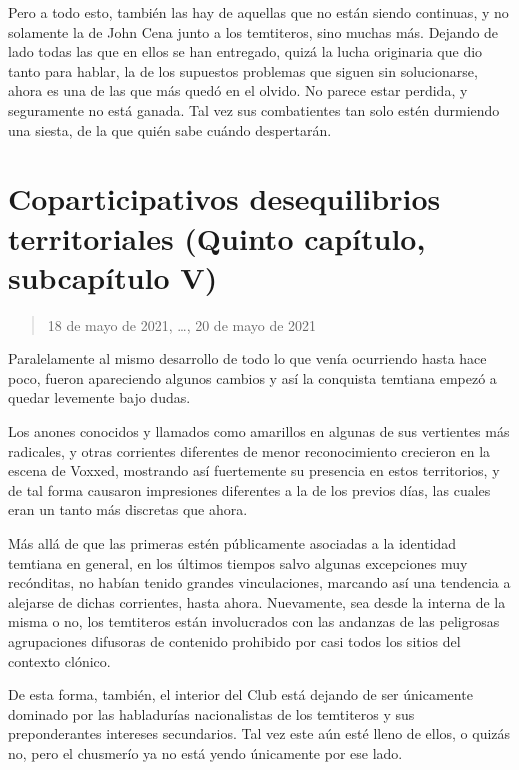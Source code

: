 \documentclass[
  spanish,
]{book}
\begin{document}
Pero a todo esto, también las hay de aquellas que no están siendo continuas, y no solamente la de John Cena junto a los temtiteros, sino muchas más. Dejando de lado todas las que en ellos se han entregado, quizá la lucha originaria que dio tanto para hablar, la de los supuestos problemas que siguen sin solucionarse, ahora es una de las que más quedó en el olvido. No parece estar perdida, y seguramente no está ganada. Tal vez sus combatientes tan solo estén durmiendo una siesta, de la que quién sabe cuándo despertarán.

\hypertarget{coparticipativos-desequilibrios-territoriales-quinto-capuxedtulo-subcapuxedtulo-v}{%
\section{Coparticipativos desequilibrios territoriales (Quinto capítulo, subcapítulo V)}\label{coparticipativos-desequilibrios-territoriales-quinto-capuxedtulo-subcapuxedtulo-v}}

\begin{quote}
18 de mayo de 2021, \ldots, 20 de mayo de 2021
\end{quote}

Paralelamente al mismo desarrollo de todo lo que venía ocurriendo hasta hace poco, fueron apareciendo algunos cambios y así la conquista temtiana empezó a quedar levemente bajo dudas.

Los anones conocidos y llamados como amarillos en algunas de sus vertientes más radicales, y otras corrientes diferentes de menor reconocimiento crecieron en la escena de Voxxed, mostrando así fuertemente su presencia en estos territorios, y de tal forma causaron impresiones diferentes a la de los previos días, las cuales eran un tanto más discretas que ahora.

Más allá de que las primeras estén públicamente asociadas a la identidad temtiana en general, en los últimos tiempos salvo algunas excepciones muy recónditas, no habían tenido grandes vinculaciones, marcando así una tendencia a alejarse de dichas corrientes, hasta ahora. Nuevamente, sea desde la interna de la misma o no, los temtiteros están involucrados con las andanzas de las peligrosas agrupaciones difusoras de contenido prohibido por casi todos los sitios del contexto clónico.

De esta forma, también, el interior del Club está dejando de ser únicamente dominado por las habladurías nacionalistas de los temtiteros y sus preponderantes intereses secundarios. Tal vez este aún esté lleno de ellos, o quizás no, pero el chusmerío ya no está yendo únicamente por ese lado.
\end{document}
